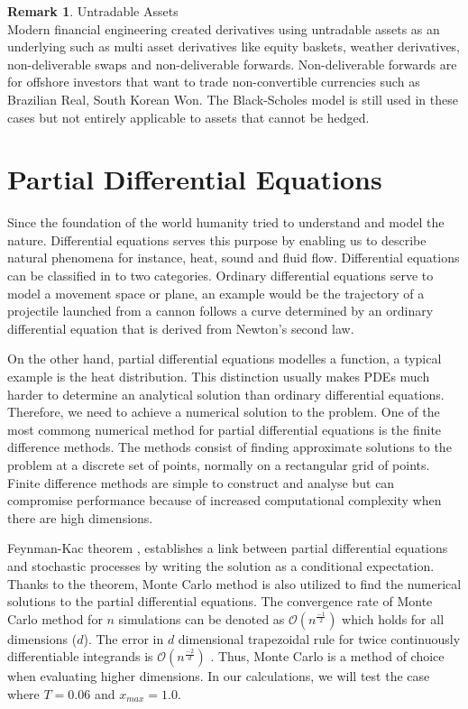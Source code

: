 \documentclass[12pt, oneside]{book}
\theoremstyle{plain}
\theoremstyle{definition}
\newtheorem{remark}[theorem]{Remark}
\begin{document}
\begin{remark}Untradable Assets\\ Modern financial engineering created derivatives using untradable assets as an underlying such as multi asset derivatives like equity baskets, weather derivatives, non-deliverable swaps and non-deliverable forwards. Non-deliverable forwards are for offshore investors that want to trade non-convertible currencies such as Brazilian Real, South Korean Won.  The Black-Scholes model is still used in these cases \cite{weather} \cite{basket} but not entirely applicable to assets that cannot be hedged.
\end{remark}


\section{Partial Differential Equations}
Since the foundation of the world humanity tried to understand and model the nature. Differential equations serves this purpose by enabling us to describe natural phenomena for instance, heat, sound and fluid flow. Differential equations can be classified in to two categories. Ordinary differential equations serve to model a movement space or plane, an example would be the trajectory of a projectile launched from a cannon follows a curve determined by an ordinary differential equation that is derived from Newton's second law.

On the other hand, partial differential equations modelles a function, a typical example is the heat distribution. This distinction usually makes PDEs much harder to determine an analytical solution than ordinary differential equations.  Therefore, we need to achieve a numerical solution to the problem. One of the most commong numerical method for partial differential equations is the finite difference methods. The methods consist of finding approximate solutions to the problem at a discrete set of points, normally on a rectangular grid of points. Finite difference methods are simple to construct and analyse but can compromise performance because of increased computational complexity when there are high dimensions. 

Feynman-Kac theorem \cite{klebaner}, establishes a link between partial differential equations and stochastic processes by writing the solution as a conditional expectation. Thanks to the theorem, Monte Carlo method is also utilized to find the numerical solutions to the partial differential equations. The convergence rate of Monte Carlo method for $n$ simulations can be denoted as $\mathcal{O}(n^{\frac{-1}{2}}) $ which holds for all dimensions ($d$).
The error in $d$ dimensional trapezoidal rule for twice continuously differentiable integrands is $\mathcal{O}(n^{\frac{-2}{d}}) $ \cite{glasserman}. Thus, Monte Carlo is a method of choice when evaluating higher dimensions. In our calculations, we will test the case where $T = 0.06$ and $x_{max} = 1.0$.
\end{document}
